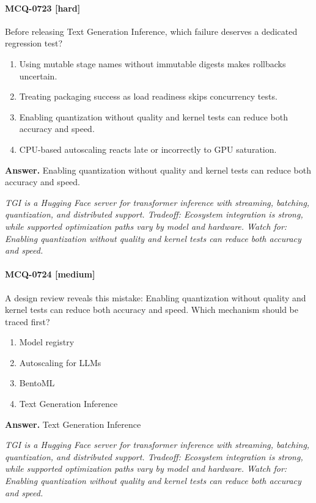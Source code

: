 \paragraph{MCQ-0723 [hard]} Before releasing Text Generation Inference, which failure deserves a dedicated regression test?
\begin{enumerate}[label=\Alph*.]
\item Using mutable stage names without immutable digests makes rollbacks uncertain.
\item Treating packaging success as load readiness skips concurrency tests.
\item Enabling quantization without quality and kernel tests can reduce both accuracy and speed.
\item CPU-based autoscaling reacts late or incorrectly to GPU saturation.
\end{enumerate}
\noindent\textbf{Answer.} Enabling quantization without quality and kernel tests can reduce both accuracy and speed.
\par\textit{TGI is a Hugging Face server for transformer inference with streaming, batching, quantization, and distributed support. Tradeoff: Ecosystem integration is strong, while supported optimization paths vary by model and hardware. Watch for: Enabling quantization without quality and kernel tests can reduce both accuracy and speed.}
\paragraph{MCQ-0724 [medium]} A design review reveals this mistake: Enabling quantization without quality and kernel tests can reduce both accuracy and speed. Which mechanism should be traced first?
\begin{enumerate}[label=\Alph*.]
\item Model registry
\item Autoscaling for LLMs
\item BentoML
\item Text Generation Inference
\end{enumerate}
\noindent\textbf{Answer.} Text Generation Inference
\par\textit{TGI is a Hugging Face server for transformer inference with streaming, batching, quantization, and distributed support. Tradeoff: Ecosystem integration is strong, while supported optimization paths vary by model and hardware. Watch for: Enabling quantization without quality and kernel tests can reduce both accuracy and speed.}
